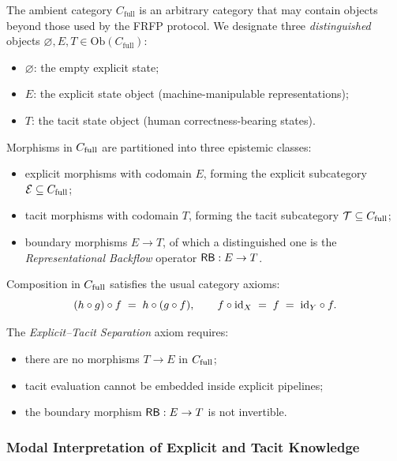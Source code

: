\begin{definition}
The ambient category \(C_{\mathrm{full}}\) is an arbitrary category that may contain objects beyond those used by the FRFP protocol. We designate three \emph{distinguished} objects
\(\varnothing, E, T \in \mathrm{Ob}(C_{\mathrm{full}})\):
\begin{itemize}
  \item \(\varnothing\): the empty explicit state;
  \item \(E\): the explicit state object (machine-manipulable representations);
  \item \(T\): the tacit state object (human correctness-bearing states).
\end{itemize}
Morphisms in \(C_{\mathrm{full}}\) are partitioned into three epistemic classes:
\begin{itemize}
  \item explicit morphisms with codomain \(E\), forming the explicit subcategory
        \(\mathcal{E} \subseteq C_{\mathrm{full}}\);
  \item tacit morphisms with codomain \(T\), forming the tacit subcategory
        \(\mathcal{T} \subseteq C_{\mathrm{full}}\);
  \item boundary morphisms \(E \to T\), of which a distinguished one is the
        \emph{Representational Backflow} operator
        \(\mathsf{RB} : E \to T\).
\end{itemize}
Composition in \(C_{\mathrm{full}}\) satisfies the usual category axioms:
\[
(h \circ g) \circ f \;=\; h \circ (g \circ f), \qquad
f \circ \mathrm{id}_X \;=\; f \;=\; \mathrm{id}_Y \circ f.
\]
\end{definition}

\begin{definition}
The \emph{Explicit--Tacit Separation} axiom requires:
\begin{itemize}
  \item there are no morphisms \(T \to E\) in \(C_{\mathrm{full}}\);
  \item tacit evaluation cannot be embedded inside explicit pipelines;
  \item the boundary morphism \(\mathsf{RB} : E \to T\) is not invertible.
\end{itemize}
\end{definition}

\subsubsection{Modal Interpretation of Explicit and Tacit Knowledge}

